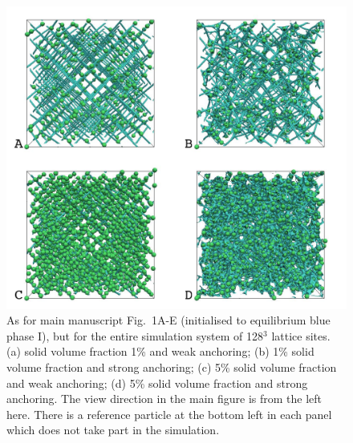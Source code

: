 \documentclass[12pt,twoside]{article}
\begin{document}
\begin{figure}
\begin{center}
\includegraphics[scale=0.35]{s1.jpg}
\end{center}
\caption{As for main manuscript Fig.~1A-E (initialised to equilibrium blue
phase I), but for the entire simulation system of 128$^3$ lattice sites. (a) 
solid volume fraction 1\% and weak anchoring; 
(b) 1\% solid volume fraction and strong anchoring;
(c) 5\% solid volume fraction and weak anchoring; (d) 5\% solid
volume fraction and strong anchoring. The view direction in the
main figure is from the left here. There is a reference
particle at the bottom left in each panel which does not take part
in the simulation.}
\end{figure}
\end{document}
